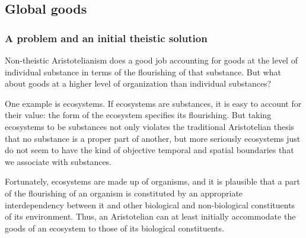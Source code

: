 
\subsection{Global goods}
\subsubsection{A problem and an initial theistic solution}
Non-theistic Aristotelianism does a good job accounting for goods at the level of individual substance
in terms of the flourishing of that substance. But what about goods at a higher level of
organization than individual substances?

One example is ecosystems. If ecosystems are substances, it is easy to account for their value: 
the form of the ecosystem specifies its flourishing. But
taking ecosystems to be substances not only violates the traditional Aristotelian thesis that no substance
is a proper part of another, but more seriously ecosystems just do not seem to have the kind of objective 
temporal and spatial boundaries that we associate with substances. 

Fortunately, ecosystems are made up of organisms, and it is plausible that a part of the flourishing of
an organism is constituted by an appropriate interdependency between it and other biological and 
non-biological constituents of its environment. Thus, an Aristotelian can at least initially accommodate the goods of an ecosystem
to those of its biological constituents. 

